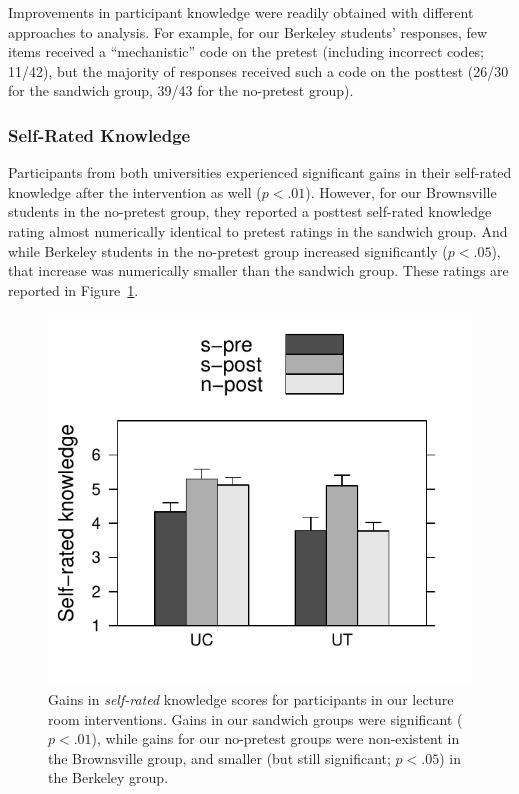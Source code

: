 Improvements in participant knowledge were readily obtained with different
approaches to analysis. For example, for our Berkeley students' responses, few
items received a “mechanistic” code on the pretest (including incorrect codes;
11/42), but the majority of responses received such a code on the posttest
(26/30 for the sandwich group, 39/43 for the no-pretest group).

\subsubsection{Self-Rated Knowledge}

Participants from both universities experienced significant gains in their self-rated
knowledge after the intervention as well ($p < .01$). However, for our
Brownsville students in the no-pretest group, they reported a posttest
self-rated knowledge rating almost numerically identical to pretest ratings in
the sandwich group. And while Berkeley students in the no-pretest group
increased significantly ($p < .05$), that increase was numerically smaller than the
sandwich group. These ratings are reported in
Figure~\ref{fig:class-self-rated}.

\begin{figure}
    \centering
    \includegraphics{class-self-rated.pdf}
    \caption{Gains in \emph{self-rated} knowledge scores for participants in our
        lecture room
        interventions. Gains in our sandwich groups were significant ($p
        < .01$), while gains for our no-pretest groups were non-existent
        in the Brownsville group, and smaller (but still significant; $p < .05$)
        in the Berkeley group.}
    \label{fig:class-self-rated}
\end{figure}

